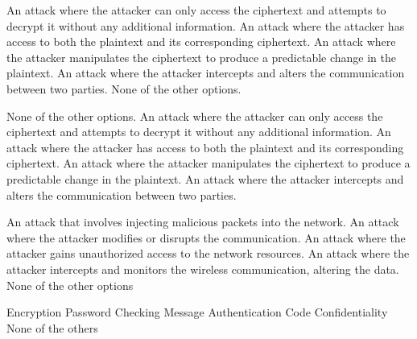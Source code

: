 \begin{checkboxes}
    \CorrectChoice An attack where the attacker can only access the ciphertext and attempts to decrypt it without any additional information.
    \choice An attack where the attacker has access to both the plaintext and its corresponding ciphertext.
    \choice An attack where the attacker manipulates the ciphertext to produce a predictable change in the plaintext.
    \choice An attack where the attacker intercepts and alters the communication between two parties.
    \choice None of the other options.
\end{checkboxes}

\begin{checkboxes}
    \CorrectChoice None of the other options.
    \choice An attack where the attacker can only access the ciphertext and attempts to decrypt it without any additional information.
    \choice An attack where the attacker has access to both the plaintext and its corresponding ciphertext.
    \choice An attack where the attacker manipulates the ciphertext to produce a predictable change in the plaintext.
    \choice An attack where the attacker intercepts and alters the communication between two parties.
\end{checkboxes}

\begin{checkboxes}
    \choice An attack that involves injecting malicious packets into the network.
    \choice An attack where the attacker modifies or disrupts the communication.
    \choice An attack where the attacker gains unauthorized access to the network resources.
    \choice An attack where the attacker intercepts and monitors the wireless communication, altering the data.
    \CorrectChoice None of the other options
\end{checkboxes}

\begin{checkboxes}
    \choice Encryption
    \choice Password Checking
    \choice Message Authentication Code
    \CorrectChoice Confidentiality
    \choice None of the others
\end{checkboxes}

